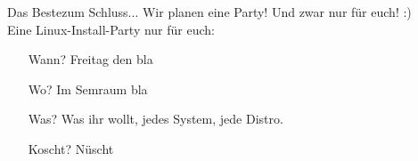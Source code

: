 \begin{frame}{Das Beste}{zum Schluss...}
	Wir planen eine Party! Und zwar nur für euch! :)\\
	Eine Linux-Install-Party nur für euch:\\
	\begin{center}
	\begin{itemize}[<+->]
		\item[Wann?] Freitag den bla
		\item[Wo?] Im Semraum bla
		\item[Was?] Was ihr wollt, jedes System, jede Distro.
		\item[Koscht?] Nüscht
	\end{itemize}
	\end{center}
\end{frame}
